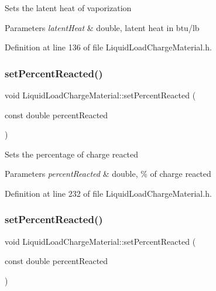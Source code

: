 Sets the latent heat of vaporization 
\begin{DoxyParams}{Parameters}
{\em latent\+Heat} & double, latent heat in btu/lb \\
\hline
\end{DoxyParams}


Definition at line 136 of file Liquid\+Load\+Charge\+Material.\+h.

\mbox{\label{class_liquid_load_charge_material_a9984b8c78a460ef3569fc3ef13eea604}} 
\subsubsection{\texorpdfstring{set\+Percent\+Reacted()}{setPercentReacted()}\hspace{0.1cm}{\footnotesize\ttfamily [1/3]}}
{\footnotesize\ttfamily void Liquid\+Load\+Charge\+Material\+::set\+Percent\+Reacted (\begin{DoxyParamCaption}\item[{const double}]{percent\+Reacted }\end{DoxyParamCaption})\hspace{0.3cm}{\ttfamily [inline]}}

Sets the percentage of charge reacted 
\begin{DoxyParams}{Parameters}
{\em percent\+Reacted} & double, \% of charge reacted \\
\hline
\end{DoxyParams}


Definition at line 232 of file Liquid\+Load\+Charge\+Material.\+h.

\mbox{\label{class_liquid_load_charge_material_a9984b8c78a460ef3569fc3ef13eea604}} 
\subsubsection{\texorpdfstring{set\+Percent\+Reacted()}{setPercentReacted()}\hspace{0.1cm}{\footnotesize\ttfamily [2/3]}}
{\footnotesize\ttfamily void Liquid\+Load\+Charge\+Material\+::set\+Percent\+Reacted (\begin{DoxyParamCaption}\item[{const double}]{percent\+Reacted }\end{DoxyParamCaption})\hspace{0.3cm}{\ttfamily [inline]}}

